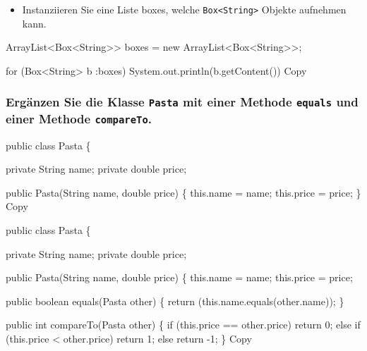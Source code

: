 \documentclass[
]{article}
\newenvironment{Shaded}{}{}
\newcommand{\NormalTok}[1]{#1}
\providecommand{\tightlist}{%
  \setlength{\itemsep}{0pt}\setlength{\parskip}{0pt}}
\begin{document}
\begin{itemize}
\tightlist
\item
  Instanziieren Sie eine Liste boxes, welche
  \texttt{Box\textless{}String\textgreater{}} Objekte aufnehmen kann.
\end{itemize}

\begin{Shaded}
\begin{Highlighting}[]
\NormalTok{ArrayList\textless{}Box\textless{}String\textgreater{}\textgreater{} boxes = new ArrayList\textless{}Box\textless{}String\textgreater{}\textgreater{};}

\NormalTok{for (Box\textless{}String\textgreater{} b :boxes)}
\NormalTok{    System.out.println(b.getContent())}
\NormalTok{Copy}
\end{Highlighting}
\end{Shaded}

\subsubsection{\texorpdfstring{Ergänzen Sie die Klasse \texttt{Pasta}
mit einer Methode \texttt{equals} und einer Methode
\texttt{compareTo}.}{Ergänzen Sie die Klasse Pasta mit einer Methode equals und einer Methode compareTo.}}\label{erguxe4nzen-sie-die-klasse-pasta-mit-einer-methode-equals-und-einer-methode-compareto.}

\begin{Shaded}
\begin{Highlighting}[]
\NormalTok{public class Pasta \{}

\NormalTok{    private String name;}
\NormalTok{    private double price;}

\NormalTok{    public Pasta(String name, double price) \{}
\NormalTok{        this.name = name;}
\NormalTok{        this.price = price;}
\NormalTok{\}}
\NormalTok{Copy}
\end{Highlighting}
\end{Shaded}

\begin{Shaded}
\begin{Highlighting}[]
\NormalTok{public class Pasta \{}

\NormalTok{    private String name;}
\NormalTok{    private double price;}

\NormalTok{    public Pasta(String name, double price) \{}
\NormalTok{        this.name = name;}
\NormalTok{        this.price = price;}

\NormalTok{    public boolean equals(Pasta other) \{}
\NormalTok{    return (this.name.equals(other.name));}
\NormalTok{    \}}

\NormalTok{    public int compareTo(Pasta other) \{}
\NormalTok{    if (this.price == other.price)}
\NormalTok{        return 0;}
\NormalTok{    else if (this.price \textless{} other.price)}
\NormalTok{            return 1;}
\NormalTok{        else}
\NormalTok{            return {-}1;}
\NormalTok{\}}
\NormalTok{Copy}
\end{Highlighting}
\end{Shaded}
\end{document}
